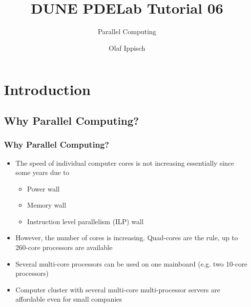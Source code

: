 \documentclass[aspectratio=169,11pt]{beamer}
\title{DUNE PDELab Tutorial 06}
\subtitle{Parallel Computing}
\author{Olaf Ippisch}
\institute[]
{
  Institut für Mathematik\\TU Clausthal
}
\theoremstyle{definition}
\begin{document}


\section{Introduction}

\subsection{Why Parallel Computing?}

\begin{frame}
\frametitle<presentation>{Why Parallel Computing?}

\begin{itemize}
\item The speed of individual computer cores is not increasing essentially since some years due to
\begin{itemize}
\item Power wall
\item Memory wall
\item Instruction level parallelism (ILP) wall
\end{itemize}
\item However, the number of cores is increasing. Quad-cores are the rule, up to 260-core processors are available
\item Several multi-core processors can be used on one mainboard (e.g. two 10-core processors)
\item Computer cluster with several multi-core multi-processor servers are affordable even for small companies
\end{itemize}

\end{frame}
\end{document}
